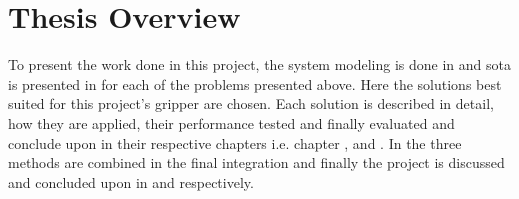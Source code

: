 

\section{Thesis Overview}\label{sec:intro-thesis-overview}

To present the work done in this project, the system modeling is done in  and \gls{sota} is presented in  for each of the problems presented above. Here the solutions best suited for this project's gripper are chosen. Each solution is described in detail, how they are applied, their performance tested and finally evaluated and conclude upon in their respective chapters i.e. chapter ,  and . In  the three methods are combined in the final integration and finally the project is discussed and concluded upon in  and  respectively.




































